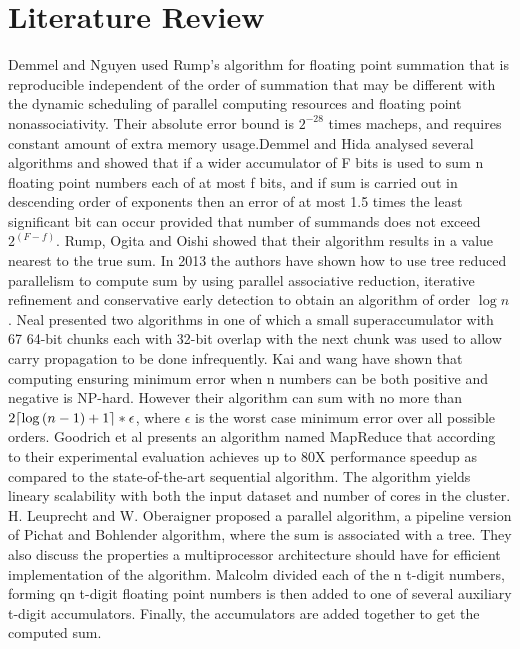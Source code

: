 \documentclass[11pt]{article}       %
\DeclarePairedDelimiter{\ceil}{\lceil}{\rceil}
\begin{document}
\section{Literature Review} \label{litrev}

Demmel and Nguyen \cite{PRS} used Rump’s algorithm for floating point summation that is reproducible independent of the order of summation that may be different with the dynamic scheduling of parallel computing resources and floating point nonassociativity. Their absolute error bound is $2^{-28}$ times macheps, and requires constant amount of extra memory usage.Demmel and Hida \cite{AEFPS} analysed several algorithms and showed that if a wider accumulator of F bits is used to sum n floating point numbers each of at most f bits, and if sum is carried out in descending order of exponents then an error of at most 1.5 times the least significant bit can occur provided that number of summands does not exceed $2^{(F-f)}$.
Rump, Ogita and Oishi \cite{AFPSPFR} showed that their algorithm results in a value nearest to the true sum. 
In 2013 the authors \cite{APFPA} have shown how to use tree reduced parallelism to compute sum by using parallel associative reduction, iterative refinement and conservative early detection to obtain an algorithm of order $\log {n}$. 
Neal \cite{FESUSLS} presented two algorithms in one of which a small superaccumulator with 67 64-bit chunks each with 32-bit overlap with the next chunk was used to allow carry propagation to be done infrequently. Kai and wang \cite{LTALCNS} have shown that computing ensuring minimum error when n numbers can be both positive and negative is NP-hard. However their algorithm can sum with no more than $2\ceil*{\log {(n-1)}+1}*\epsilon$, where $\epsilon$ is the worst case minimum error over all possible orders.
Goodrich et al \cite{PASFPN} presents an algorithm named MapReduce that according to their experimental evaluation achieves up to 80X performance speedup as compared to the state-of-the-art sequential algorithm. The algorithm yields lineary scalability with both the input dataset and number of cores in the cluster.
H. Leuprecht and W. Oberaigner \cite{PARESFP} proposed a parallel algorithm, a pipeline version of Pichat and Bohlender algorithm, where the sum is associated with a tree. They also discuss the properties a multiprocessor architecture should have for efficient implementation of the algorithm.
Malcolm \cite{OAFPS} divided each of the n t-digit numbers, forming qn t-digit floating point numbers is then added to one of several  auxiliary t-digit accumulators. Finally, the accumulators are added together to get the computed sum.
\end{document}

